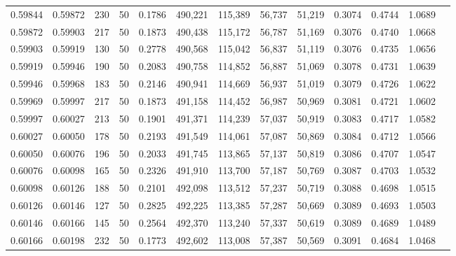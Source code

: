 \begin{tabular}{rrrrrrrrrrrrr}
0.59844 & 0.59872 &   230 &  50 &                                     0.1786 & 490,221 & 115,389 &  56,737 &  51,219 & 0.3074 & 0.4744 & 1.0689 \\
0.59872 & 0.59903 &   217 &  50 &                                     0.1873 & 490,438 & 115,172 &  56,787 &  51,169 & 0.3076 & 0.4740 & 1.0668 \\
0.59903 & 0.59919 &   130 &  50 &                                     0.2778 & 490,568 & 115,042 &  56,837 &  51,119 & 0.3076 & 0.4735 & 1.0656 \\
0.59919 & 0.59946 &   190 &  50 &                                     0.2083 & 490,758 & 114,852 &  56,887 &  51,069 & 0.3078 & 0.4731 & 1.0639 \\
0.59946 & 0.59968 &   183 &  50 &                                     0.2146 & 490,941 & 114,669 &  56,937 &  51,019 & 0.3079 & 0.4726 & 1.0622 \\
0.59969 & 0.59997 &   217 &  50 &                                     0.1873 & 491,158 & 114,452 &  56,987 &  50,969 & 0.3081 & 0.4721 & 1.0602 \\
0.59997 & 0.60027 &   213 &  50 &                                     0.1901 & 491,371 & 114,239 &  57,037 &  50,919 & 0.3083 & 0.4717 & 1.0582 \\
0.60027 & 0.60050 &   178 &  50 &                                     0.2193 & 491,549 & 114,061 &  57,087 &  50,869 & 0.3084 & 0.4712 & 1.0566 \\
0.60050 & 0.60076 &   196 &  50 &                                     0.2033 & 491,745 & 113,865 &  57,137 &  50,819 & 0.3086 & 0.4707 & 1.0547 \\
0.60076 & 0.60098 &   165 &  50 &                                     0.2326 & 491,910 & 113,700 &  57,187 &  50,769 & 0.3087 & 0.4703 & 1.0532 \\
0.60098 & 0.60126 &   188 &  50 &                                     0.2101 & 492,098 & 113,512 &  57,237 &  50,719 & 0.3088 & 0.4698 & 1.0515 \\
0.60126 & 0.60146 &   127 &  50 &                                     0.2825 & 492,225 & 113,385 &  57,287 &  50,669 & 0.3089 & 0.4693 & 1.0503 \\
0.60146 & 0.60166 &   145 &  50 &                                     0.2564 & 492,370 & 113,240 &  57,337 &  50,619 & 0.3089 & 0.4689 & 1.0489 \\
0.60166 & 0.60198 &   232 &  50 &                                     0.1773 & 492,602 & 113,008 &  57,387 &  50,569 & 0.3091 & 0.4684 & 1.0468 \\

\end{tabular}
